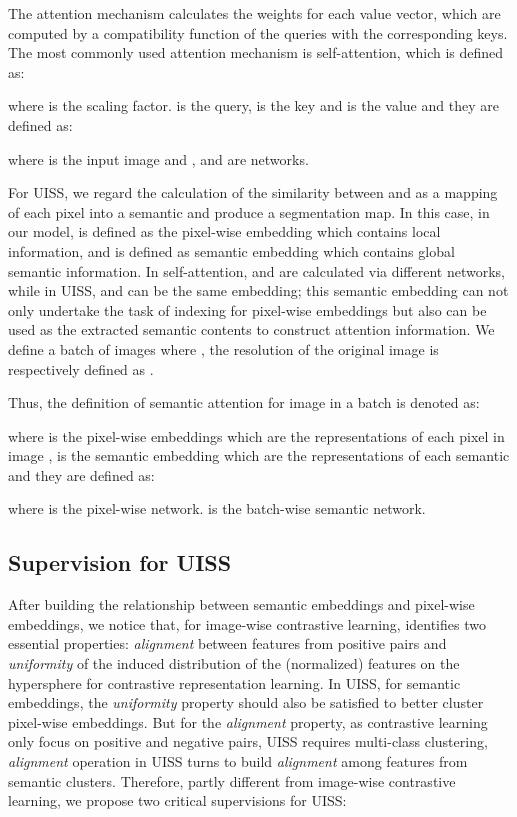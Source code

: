 \documentclass[letterpaper]{article} \usepackage{aaai23}  \usepackage{times}  \usepackage{helvet}  \usepackage{courier}  \usepackage[hyphens]{url}  \usepackage{graphicx} \urlstyle{rm} \def\UrlFont{\rm}  \usepackage{natbib}  \usepackage{caption} \frenchspacing  \setlength{\pdfpagewidth}{8.5in}  \setlength{\pdfpageheight}{11in}  \usepackage{algorithm}
\begin{document}
The attention mechanism calculates the weights for each value vector, which are computed by a compatibility function of the
queries with the corresponding keys. The most commonly used attention mechanism is self-attention\cite{vaswani2017attention}, which is defined as:

where is the scaling factor.  is the query,  is the key and  is the value and they are defined as:

where  is the input image and ,  and  are networks.

For UISS, we regard the calculation of the similarity between  and  as a mapping of each pixel into a semantic and produce a segmentation map. In this case, in our model,  is defined as the pixel-wise embedding which contains local information, and  is defined as semantic embedding which contains global semantic information. In self-attention,  and  are calculated via different networks, while in UISS,  and  can be the same embedding; this semantic embedding can not only undertake the task of indexing for pixel-wise embeddings but also can be used as the extracted semantic contents to construct attention information. We define a batch of  images  where , the resolution of the original image is respectively defined as . 

Thus, the definition of semantic attention for image  in a batch is denoted as:

where  is the pixel-wise embeddings which are the representations of each pixel in image ,  is the semantic embedding which are the representations of each semantic and they are defined as:

where  is the pixel-wise network.  is the batch-wise semantic network.

\subsection{Supervision for UISS}
After building the relationship between semantic embeddings and pixel-wise embeddings, we notice that, for image-wise contrastive learning, \cite{wang2020understanding} identifies two essential properties: \textit{alignment} between features from positive pairs and \textit{uniformity} of the induced distribution of the (normalized) features on the hypersphere for contrastive representation learning. In UISS, for semantic embeddings, the \textit{uniformity} property should also be satisfied to better cluster pixel-wise embeddings. But for the \textit{alignment} property, as contrastive learning only focus on positive and negative pairs, UISS requires multi-class clustering, \textit{alignment} operation in UISS turns to build \textit{alignment} among features from semantic clusters. 
Therefore, partly different from image-wise contrastive learning, we propose two critical supervisions for UISS:
\end{document}
